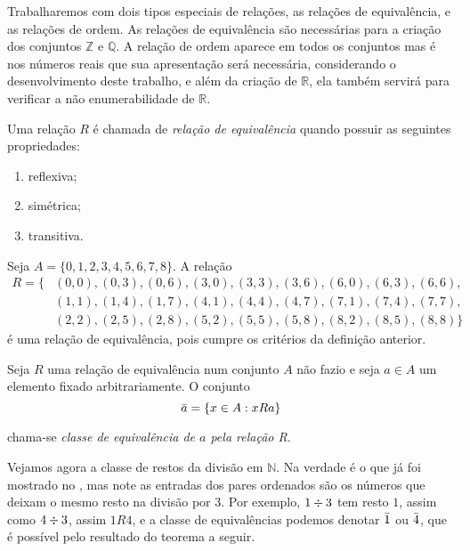 \documentclass[../main.tex]{subfiles}
\begin{document}
Trabalharemos com dois tipos especiais de relações, as relações de equivalência, e as relações de ordem.  As relações de equivalência são necessárias para a criação dos conjuntos $\mathbb{Z}$ e $\mathbb{Q}$. A relação de ordem aparece em todos os conjuntos mas é nos números reais que sua apresentação será necessária, considerando o desenvolvimento deste trabalho, e além da criação de $\mathbb{R}$, ela também servirá para verificar a não enumerabilidade de $\mathbb{R}$.

\begin{defi}
    Uma relação $R$ é chamada de \emph{relação de equivalência} quando possuir as seguintes propriedades:
    \begin{enumerate}[label=(\roman*)]
        \item reflexiva;
        \item simétrica;
        \item transitiva.
    \end{enumerate}
\end{defi}

\begin{ex}\label{agb-ex-restosDiv3}
    Seja $A = \{0,1,2,3,4,5,6,7,8\}$. A relação 
    \begin{align*}
        R = \{ & (0,0), (0,3), (0,6), (3,0), (3,3), (3,6), (6,0),(6,3), (6,6), \\
    & (1,1), (1,4), (1,7), (4,1), (4,4), (4,7), (7,1), (7,4), (7,7), \\
    & (2,2), (2,5), (2,8), (5,2), (5,5), (5,8), (8,2), (8,5), (8,8) \}
    \end{align*}
    é uma relação de equivalência, pois cumpre os critérios da definição anterior.    
\end{ex}


\begin{defi}
    Seja $R$ uma relação de equivalência num conjunto $A$ não fazio e seja $a \in A$ um elemento fixado arbitrariamente. O conjunto \\
    \[ \Bar{a} = \{x \in A : xRa\} \]
    
    chama-se \emph{classe de equivalência de $a$ pela relação R}.
\end{defi}

\begin{ex} 
    Vejamos agora a classe de restos da divisão em $\mathbb{N}$. Na verdade é o que já foi mostrado no , mas note as entradas dos pares ordenados são os números que deixam o mesmo resto na divisão por $3$. Por exemplo, $1 \divisionsymbol 3$ tem resto $1$, assim como $4 \divisionsymbol 3$, assim $1R4$, e a classe de equivalências podemos denotar $\Bar{1}$ ou $\Bar{4}$, que é possível pelo resultado do teorema a seguir.
\end{ex}
\end{document}
